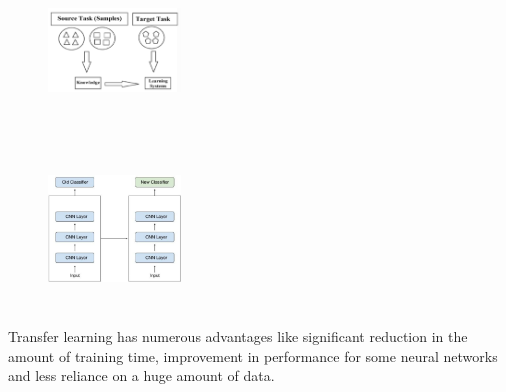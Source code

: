 \begin{figure}
  \centering
  \begin{minipage}[t]{.45\textwidth}
    \centering
    \includegraphics[width=100pt,height=120pt]{pictures/source_target.PNG}
    \label{fig:source_target}
  \end{minipage}%
  \hspace{1cm}
  \begin{minipage}[t]{.45\textwidth}
    \centering
    \includegraphics[width=100pt,height=120pt]{pictures/transfer_learning.PNG}
    \label{fig:transfer_learning}
  \end{minipage}  
\end{figure}
Transfer learning has numerous advantages like significant reduction in the amount of training time\cite*{liu2019exploring}, improvement in performance for some neural networks\cite*{pan2011transfer} and less reliance on a huge amount of data\cite*{duan2012learning,kulis2011you,zhu2011heterogeneous}.  
